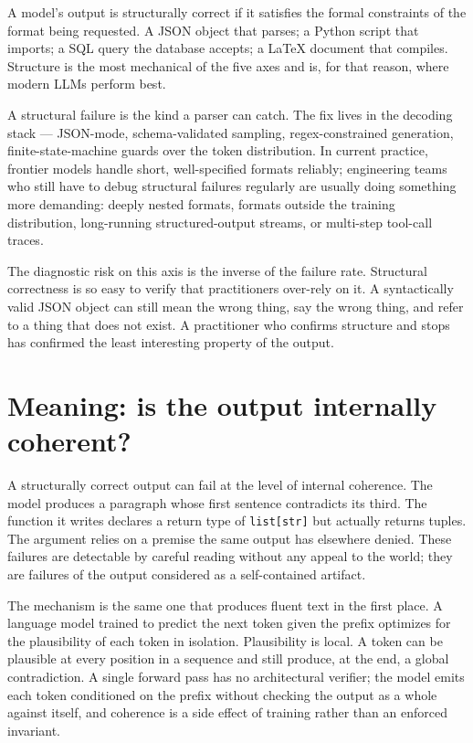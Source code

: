 \documentclass[11pt,a4paper]{article}
\begin{document}
A model's output is structurally correct if it satisfies the formal
constraints of the format being requested. A JSON object that
parses; a Python script that imports; a SQL query the database
accepts; a LaTeX document that compiles. Structure is the most
mechanical of the five axes and is, for that reason, where modern
LLMs perform best.

A structural failure is the kind a parser can catch. The fix lives
in the decoding stack --- JSON-mode, schema-validated sampling,
regex-constrained generation, finite-state-machine guards over the
token distribution. In current practice, frontier models handle
short, well-specified formats reliably; engineering teams who still
have to debug structural failures regularly are usually doing
something more demanding: deeply nested formats, formats outside
the training distribution, long-running structured-output streams,
or multi-step tool-call traces.

The diagnostic risk on this axis is the inverse of the failure
rate. Structural correctness is so easy to verify that practitioners
over-rely on it. A syntactically valid JSON object can still mean
the wrong thing, say the wrong thing, and refer to a thing that
does not exist. A practitioner who confirms structure and stops has
confirmed the least interesting property of the output.

\section*{Meaning: is the output internally coherent?}

A structurally correct output can fail at the level of internal
coherence. The model produces a paragraph whose first sentence
contradicts its third. The function it writes declares a return
type of \texttt{list[str]} but actually returns tuples. The argument
relies on a premise the same output has elsewhere denied. These
failures are detectable by careful reading without any appeal to
the world; they are failures of the output considered as a
self-contained artifact.

The mechanism is the same one that produces fluent text in the
first place. A language model trained to predict the next token
given the prefix optimizes for the plausibility of each token in
isolation. Plausibility is local. A token can be plausible at every
position in a sequence and still produce, at the end, a global
contradiction. A single forward pass has no architectural verifier;
the model emits each token conditioned on the prefix without
checking the output as a whole against itself, and coherence is a
side effect of training rather than an enforced invariant.
\end{document}
